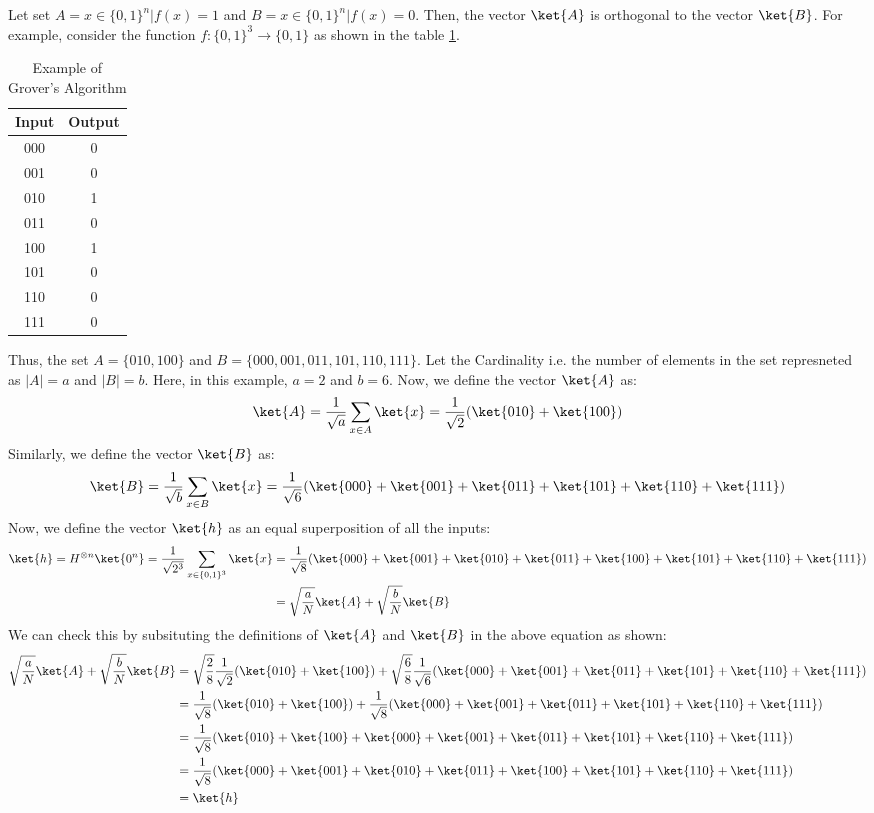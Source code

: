 \documentclass[12pt, oneside]{book}
\theoremstyle{definition}
\theoremstyle{definition}
\theoremstyle{remark}
\begin{document}
Let set $A={x \in \{0,1\}^n|f(x)=1}$ and $B={x \in \{0,1\}^n|f(x)=0}$. Then, the vector $\ket{A}$ is orthogonal to the vector $\ket{B}$.
For example, consider the function $f:\{0,1\}^3 \rightarrow \{0,1\}$ as shown in the table \ref{tab:groverex1}.
\begin{table}[H]
    \centering
    \begin{tabular}{|c|c|}
        \hline
        Input & Output \\
        \hline
        000 & 0 \\
        001 & 0 \\
        010 & 1 \\
        011 & 0 \\
        100 & 1 \\
        101 & 0 \\
        110 & 0 \\
        111 & 0 \\
        \hline
    \end{tabular}
    \caption{Example of Grover's Algorithm}
    \label{tab:groverex1}   
\end{table}
Thus, the set $A=\{010,100\}$ and $B=\{000,001,011,101,110,111\}$. Let the Cardinality i.e. the number of elements in the set represneted as $|A|=a$ and $|B|=b$.
Here, in this example, $a=2$ and $b=6$. Now, we define the vector $\ket{A}$ as:
\[
    \ket{A}=\frac{1}{\sqrt{a}}\sum_{x \in A}\ket{x}=\frac{1}{\sqrt{2}}(\ket{010}+\ket{100})
\]
Similarly, we define the vector $\ket{B}$ as:
\[
    \ket{B}=\frac{1}{\sqrt{b}}\sum_{x \in B}\ket{x}=\frac{1}{\sqrt{6}}(\ket{000}+\ket{001}+\ket{011}+\ket{101}+\ket{110}+\ket{111})
\]
Now, we define the vector $\ket{h}$ as an equal superposition of all the inputs:
\begin{align*}
    \ket{h}=H^{\otimes n}\ket{0^n}=\frac{1}{\sqrt{2^3}}\sum_{x \in \{0,1\}^3}\ket{x}&=\frac{1}{\sqrt{8}}(\ket{000}+\ket{001}+\ket{010}+\ket{011}+\ket{100}+\ket{101}+\ket{110}+\ket{111})\\
    &=\sqrt{\frac{a}{N}}\ket{A}+\sqrt{\frac{b}{N}}\ket{B}
\end{align*}
We can check this by subsituting the definitions of $\ket{A}$ and $\ket{B}$ in the above equation as shown:
\begin{align*}
    \sqrt{\frac{a}{N}}\ket{A}+\sqrt{\frac{b}{N}}\ket{B}&=\sqrt{\frac{2}{8}}\frac{1}{\sqrt{2}}(\ket{010}+\ket{100})+\sqrt{\frac{6}{8}}\frac{1}{\sqrt{6}}(\ket{000}+\ket{001}+\ket{011}+\ket{101}+\ket{110}+\ket{111}) \\
    &=\frac{1}{\sqrt{8}}(\ket{010}+\ket{100})+\frac{1}{\sqrt{8}}(\ket{000}+\ket{001}+\ket{011}+\ket{101}+\ket{110}+\ket{111}) \\
    &=\frac{1}{\sqrt{8}}(\ket{010}+\ket{100}+\ket{000}+\ket{001}+\ket{011}+\ket{101}+\ket{110}+\ket{111}) \\
    &=\frac{1}{\sqrt{8}}(\ket{000}+\ket{001}+\ket{010}+\ket{011}+\ket{100}+\ket{101}+\ket{110}+\ket{111}) \\
    &=\ket{h}
\end{align*}
\end{document}
